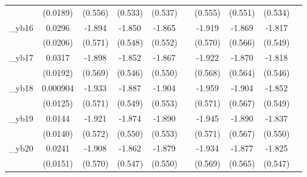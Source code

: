 \begin{table}[htbp]
\begin{tabular}{l*{9}{c}}
            &    (0.0189)         &     (0.556)         &     (0.533)         &     (0.537)         &                     &     (0.555)         &     (0.551)         &     (0.534)         &                     \\
[1em]
\_yb16       &      0.0296         &      -1.894\sym{***}&      -1.850\sym{***}&      -1.865\sym{***}&                     &      -1.919\sym{***}&      -1.869\sym{***}&      -1.817\sym{***}&                     \\
            &    (0.0206)         &     (0.571)         &     (0.548)         &     (0.552)         &                     &     (0.570)         &     (0.566)         &     (0.549)         &                     \\
[1em]
\_yb17       &      0.0317\sym{*}  &      -1.898\sym{***}&      -1.852\sym{***}&      -1.867\sym{***}&                     &      -1.922\sym{***}&      -1.870\sym{***}&      -1.818\sym{***}&                     \\
            &    (0.0192)         &     (0.569)         &     (0.546)         &     (0.550)         &                     &     (0.568)         &     (0.564)         &     (0.546)         &                     \\
[1em]
\_yb18       &    0.000904         &      -1.933\sym{***}&      -1.887\sym{***}&      -1.904\sym{***}&                     &      -1.959\sym{***}&      -1.904\sym{***}&      -1.852\sym{***}&                     \\
            &    (0.0125)         &     (0.571)         &     (0.549)         &     (0.553)         &                     &     (0.571)         &     (0.567)         &     (0.549)         &                     \\
[1em]
\_yb19       &      0.0144         &      -1.921\sym{***}&      -1.874\sym{***}&      -1.890\sym{***}&                     &      -1.945\sym{***}&      -1.890\sym{***}&      -1.837\sym{***}&                     \\
            &    (0.0140)         &     (0.572)         &     (0.550)         &     (0.553)         &                     &     (0.571)         &     (0.567)         &     (0.550)         &                     \\
[1em]
\_yb20       &      0.0241         &      -1.908\sym{***}&      -1.862\sym{***}&      -1.879\sym{***}&                     &      -1.934\sym{***}&      -1.877\sym{***}&      -1.825\sym{***}&                     \\
            &    (0.0151)         &     (0.570)         &     (0.547)         &     (0.550)         &                     &     (0.569)         &     (0.565)         &     (0.547)         &                     \\

\end{tabular}
\end{table}
